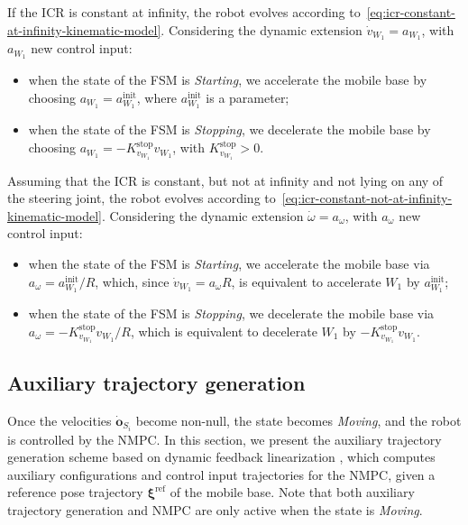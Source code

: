 If the ICR is constant at infinity, the robot evolves according
to~\eqref{eq:icr-constant-at-infinity-kinematic-model}.
Considering the dynamic extension $\dot{v}_{W_1}=a_{W_1}$, with $a_{W_1}$ new control input:
\begin{itemize}
    \item when the state of the FSM is \textit{Starting},
        we accelerate the mobile base by choosing
        $a_{W_1} = a_{W_1}^{\mathrm{init}}$, where $a_{W_1}^{\mathrm{init}}$
        is a parameter;
    \item when the state of the FSM is \textit{Stopping}, we decelerate the
        mobile base by choosing $a_{W_1} = -K_{v_{W_1}}^{\mathrm{stop}} v_{W_1}$,
        with $K_{v_{W_1}}^{\mathrm{stop}} > 0$.
\end{itemize}

Assuming that the ICR is constant, but not at infinity and not lying on any of
the steering joint, the robot evolves according to~\eqref{eq:icr-constant-not-at-infinity-kinematic-model}.
Considering the dynamic extension $\dot{\omega}=a_{\omega}$, with
$a_{\omega}$ new control input:
\begin{itemize}
    \item when the state of the FSM is \textit{Starting}, we accelerate the
        mobile base via $a_{\omega} = a_{W_1}^{\mathrm{init}} / R$, which,
        since $\dot{v}_{W_1}=a_{\omega} R$, is equivalent to accelerate $W_1$ by $a_{W_1}^{\mathrm{init}}$;
    \item when the state of the FSM is \textit{Stopping}, we decelerate the
        mobile base via $a_{\omega} = -K_{v_{W_1}}^{\mathrm{stop}} v_{W_1} / R$,
        which is equivalent to decelerate $W_1$ by $-K_{v_{W_1}}^{\mathrm{stop}} v_{W_1}$.
\end{itemize}

\subsection{Auxiliary trajectory generation}
Once the velocities $\dot{\bm{o}}_{S_i}$ become non-null, the state becomes
\textit{Moving}, and the robot is controlled by the NMPC. In this section, we
present the auxiliary trajectory generation scheme based on dynamic feedback
linearization \cite{Oriolo2002WMRControlDFL}, which computes auxiliary
configurations and control input trajectories for the NMPC, given a reference
pose trajectory $\bm{\xi}^{\mathrm{ref}}$ of the mobile base. Note that both
auxiliary trajectory generation and NMPC are only active when the state is
\textit{Moving}.

